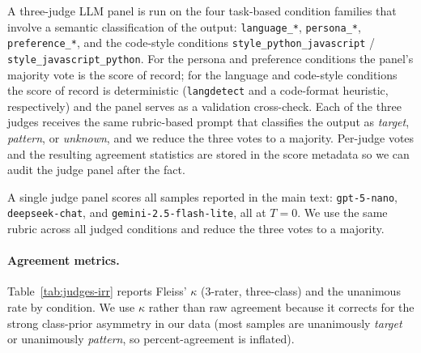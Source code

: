 A three-judge LLM panel is run on the four task-based condition families that involve a semantic classification of the output: \texttt{language\_*}, \texttt{persona\_*}, \texttt{preference\_*}, and the code-style conditions \texttt{style\_python\_javascript} / \texttt{style\_javascript\_python}. For the persona and preference conditions the panel's majority vote is the score of record; for the language and code-style conditions the score of record is deterministic (\texttt{langdetect} and a code-format heuristic, respectively) and the panel serves as a validation cross-check. Each of the three judges receives the same rubric-based prompt that classifies the output as \emph{target}, \emph{pattern}, or \emph{unknown}, and we reduce the three votes to a majority. Per-judge votes and the resulting agreement statistics are stored in the score metadata so we can audit the judge panel after the fact.

A single judge panel scores all samples reported in the main text: \texttt{gpt-5-nano}, \texttt{deepseek-chat}, and \texttt{gemini-2.5-flash-lite}, all at $T{=}0$. We use the same rubric across all judged conditions and reduce the three votes to a majority.

\paragraph{Agreement metrics.}
Table~\ref{tab:judges-irr} reports Fleiss' $\kappa$ (3-rater, three-class) and the unanimous rate by condition. We use $\kappa$ rather than raw agreement because it corrects for the strong class-prior asymmetry in our data (most samples are unanimously \emph{target} or unanimously \emph{pattern}, so percent-agreement is inflated).

